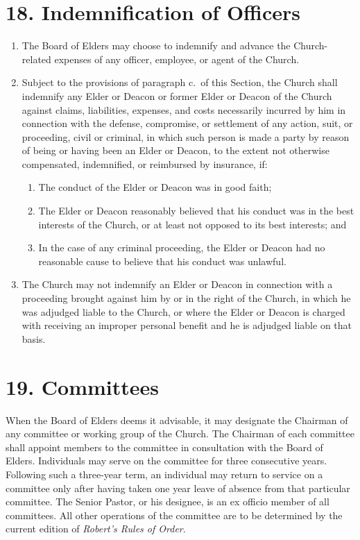 \documentclass[
]{book}
\providecommand{\tightlist}{%
  \setlength{\itemsep}{0pt}\setlength{\parskip}{0pt}}
\begin{document}
\hypertarget{indemnification-of-officers}{%
\section{18. Indemnification of Officers}\label{indemnification-of-officers}}

\begin{enumerate}
\def\labelenumi{\alph{enumi}.}
\item
  The Board of Elders may choose to indemnify and advance the Church-related expenses of any officer, employee, or agent of the Church.
\item
  Subject to the provisions of paragraph c.~of this Section, the Church shall indemnify any Elder or Deacon or former Elder or Deacon of the Church against claims, liabilities, expenses, and costs necessarily incurred by him in connection with the defense, compromise, or settlement of any action, suit, or proceeding, civil or criminal, in which such person is made a party by reason of being or having been an Elder or Deacon, to the extent not otherwise compensated, indemnified, or reimbursed by insurance, if:

  \begin{enumerate}
  \def\labelenumii{(\arabic{enumii})}
  \tightlist
  \item
    The conduct of the Elder or Deacon was in good faith;
  \item
    The Elder or Deacon reasonably believed that his conduct was in the best interests of the Church, or at least not opposed to its best interests; and
  \item
    In the case of any criminal proceeding, the Elder or Deacon had no reasonable cause to believe that his conduct was unlawful.
  \end{enumerate}
\item
  The Church may not indemnify an Elder or Deacon in connection with a proceeding brought against him by or in the right of the Church, in which he was adjudged liable to the Church, or where the Elder or Deacon is charged with receiving an improper personal benefit and he is adjudged liable on that basis.
\end{enumerate}

\hypertarget{committees}{%
\section{19. Committees}\label{committees}}

When the Board of Elders deems it advisable, it may designate the Chairman of any committee or working group of the Church. The Chairman of each committee shall appoint members to the committee in consultation with the Board of Elders. Individuals may serve on the committee for three consecutive years. Following such a three-year term, an individual may return to service on a committee only after having taken one year leave of absence from that particular committee. The Senior Pastor, or his designee, is an ex officio member of all committees. All other operations of the committee are to be determined by the current edition of \emph{Robert's Rules of Order}.
\end{document}
